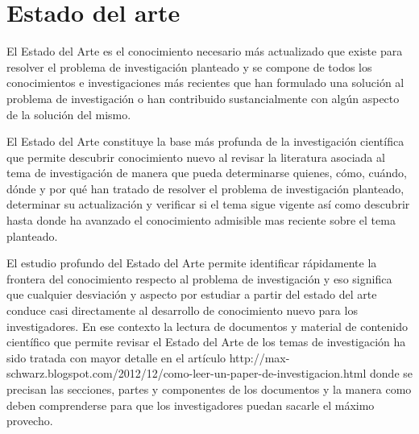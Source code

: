 \section{Estado del arte}

El Estado del Arte es el conocimiento necesario más actualizado que existe para resolver el problema de investigación planteado y se compone de todos los conocimientos e investigaciones más recientes que han formulado una solución al problema de investigación o han contribuido sustancialmente con algún aspecto de la solución del mismo.

El Estado del Arte constituye la base más profunda de la investigación científica que permite descubrir conocimiento nuevo al revisar la literatura asociada al tema de investigación de manera que pueda determinarse quienes, cómo, cuándo, dónde y por qué han tratado de resolver el problema de investigación planteado, determinar su actualización y verificar si el tema sigue vigente así como descubrir hasta donde ha avanzado el conocimiento admisible mas reciente sobre el tema planteado.

El estudio profundo del Estado del Arte permite identificar rápidamente la frontera del conocimiento respecto al problema de investigación y eso significa que cualquier desviación y aspecto por estudiar a partir del estado del arte conduce casi directamente al desarrollo de  conocimiento nuevo para los investigadores.
En ese contexto la lectura de documentos y material de contenido científico que permite revisar el Estado del Arte de los temas de investigación ha sido tratada con mayor detalle en el artículo http://max-schwarz.blogspot.com/2012/12/como-leer-un-paper-de-investigacion.html  donde se precisan las secciones, partes y componentes de los documentos y la manera como deben comprenderse para que los investigadores puedan sacarle el máximo provecho.
